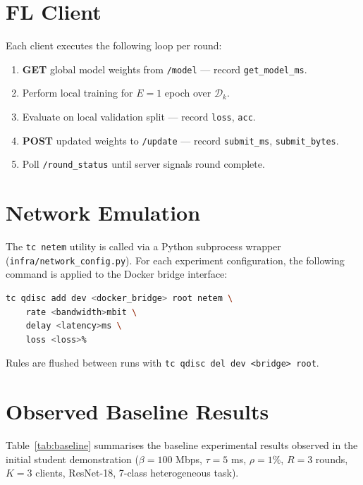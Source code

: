 \documentclass[12pt,a4paper]{report}
\begin{document}
\section{FL Client}

Each client executes the following loop per round:

\begin{enumerate}
  \item \textbf{GET} global model weights from \texttt{/model} — record \texttt{get\_model\_ms}.
  \item Perform local training for $E = 1$ epoch over $\mathcal{D}_k$.
  \item Evaluate on local validation split — record \texttt{loss}, \texttt{acc}.
  \item \textbf{POST} updated weights to \texttt{/update} — record \texttt{submit\_ms}, \texttt{submit\_bytes}.
  \item Poll \texttt{/round\_status} until server signals round complete.
\end{enumerate}

\section{Network Emulation}

The \texttt{tc netem} utility is called via a Python subprocess wrapper (\texttt{infra/network\_config.py}). For each experiment configuration, the following command is applied to the Docker bridge interface:

\begin{lstlisting}[language=bash, caption={tc netem command template}, label=lst:netem]
tc qdisc add dev <docker_bridge> root netem \
    rate <bandwidth>mbit \
    delay <latency>ms \
    loss <loss>%
\end{lstlisting}

Rules are flushed between runs with \texttt{tc qdisc del dev <bridge> root}.

\section{Observed Baseline Results}

Table~\ref{tab:baseline} summarises the baseline experimental results observed in the initial student demonstration ($\beta=100$ Mbps, $\tau=5$ ms, $\rho=1\%$, $R=3$ rounds, $K=3$ clients, ResNet-18, 7-class heterogeneous task).
\end{document}
